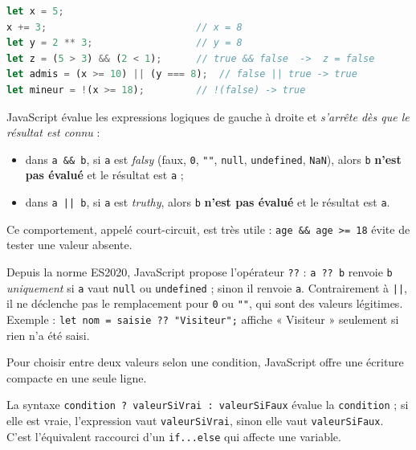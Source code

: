 \documentclass[11pt]{article}
\newcommand{\cle}[1]{{\popxbold\color{popdark}#1}}
\newcounter{popsec}
\newcounter{popsub}
\newcommand{\courssub}[1]{%
  \stepcounter{popsub}%
  \par\vspace{9pt}\noindent{\popxbold\fontsize{11.5}{13}\selectfont\color{popink}{\color{poporange}\thepopsec.\thepopsub}\hspace{6pt}#1}\par\nopagebreak\vspace{4pt}
}
\begin{document}
\begin{exemplebox}
\begin{lstlisting}[language=JavaScript]
let x = 5;
x += 3;                          // x = 8
let y = 2 ** 3;                  // y = 8
let z = (5 > 3) && (2 < 1);      // true && false  ->  z = false
let admis = (x >= 10) || (y === 8);  // false || true -> true
let mineur = !(x >= 18);         // !(false) -> true
\end{lstlisting}
\end{exemplebox}

\begin{propriete}
JavaScript évalue les expressions logiques de gauche à droite et \emph{s'arrête dès que le résultat est connu} :
\begin{itemize}
\item dans \texttt{a \&\& b}, si \texttt{a} est \emph{falsy} (faux, \texttt{0}, \texttt{""}, \texttt{null}, \texttt{undefined}, \texttt{NaN}), alors \texttt{b} \textbf{n'est pas évalué} et le résultat est \texttt{a} ;
\item dans \texttt{a || b}, si \texttt{a} est \emph{truthy}, alors \texttt{b} \textbf{n'est pas évalué} et le résultat est \texttt{a}.
\end{itemize}
Ce comportement, appelé \cle{court-circuit}, est très utile : \texttt{age \&\& age >= 18} évite de tester une valeur absente.
\end{propriete}

\begin{savaistu}
Depuis la norme ES2020, JavaScript propose l'opérateur \texttt{??} : \texttt{a ?? b} renvoie \texttt{b} \emph{uniquement} si \texttt{a} vaut \texttt{null} ou \texttt{undefined} ; sinon il renvoie \texttt{a}. Contrairement à \texttt{||}, il ne déclenche pas le remplacement pour \texttt{0} ou \texttt{""}, qui sont des valeurs légitimes. Exemple : \texttt{let nom = saisie ?? "Visiteur";} affiche « Visiteur » seulement si rien n'a été saisi.
\end{savaistu}

\courssub{L'expression ternaire}

Pour choisir entre deux valeurs selon une condition, JavaScript offre une écriture compacte en une seule ligne.

\begin{propriete}
La syntaxe \texttt{condition ? valeurSiVrai : valeurSiFaux} évalue la \texttt{condition} ; si elle est vraie, l'expression vaut \texttt{valeurSiVrai}, sinon elle vaut \texttt{valeurSiFaux}. C'est l'équivalent raccourci d'un \texttt{if...else} qui affecte une variable.
\end{propriete}
\end{document}
